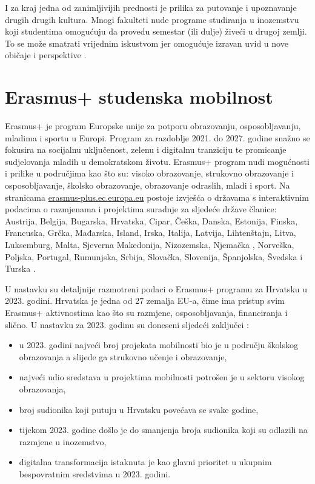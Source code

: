 \documentclass[]{foi}
\begin{document}
I za kraj jedna od zanimljivijih prednosti je prilika za putovanje i upoznavanje drugih drugih kultura. Mnogi fakulteti nude programe studiranja u inozemstvu koji studentima omogućuju da provedu 
semestar (ili dulje) živeći u drugoj zemlji. To se može smatrati vrijednim iskustvom jer omogućuje izravan uvid u nove običaje i perspektive \cite{bisio2025college}.


\section{Erasmus+ studenska mobilnost}

Erasmus+ je program Europske unije za potporu obrazovanju, osposobljavanju, mladima i sportu u Europi. Program za razdoblje 2021. do 2027. godine snažno se fokusira na socijalnu uključenost,
zelenu i digitalnu tranziciju te promicanje sudjelovanja mladih u demokratskom životu. Erasmus+ program nudi mogućnosti i prilike u područjima kao što su: visoko obrazovanje, strukovno obrazovanje i osposobljavanje,
školsko obrazovanje, obrazovanje odraslih, mladi i sport. 
Na stranicama \underline{erasmus-plus.ec.europa.eu} postoje izvješća o državama s interaktivnim podacima o razmjenama i projektima suradnje za sljedeće države članice:
Austrija, Belgija, Bugarska, Hrvatska, Cipar, Češka, Danska, Estonija, Finska, Francuska, Grčka, Mađarska, Island, Irska, Italija, Latvija, Lihtenštajn, Litva, 
Luksemburg, Malta, Sjeverna Makedonija, Nizozemska, Njemačka , Norveška, Poljska, Portugal, Rumunjska, Srbija, Slovačka, Slovenija, Španjolska, Švedska i Turska \cite{erasmus2025}.

U nastavku su detaljnije razmotreni podaci o Erasmus+ programu za Hrvatsku u 2023. godini. Hrvatska je jedna od 27 zemalja EU-a, čime ima pristup svim Erasmus+ 
aktivnostima kao što su razmjene, osposobljavanja, financiranja i slično. U nastavku za 2023. godinu su doneseni sljedeći zaključci \cite{erasmus2023croatia}:
\begin{itemize}
    \item u 2023. godini najveći broj projekata mobilnosti bio je u području školskog obrazovanja a slijede ga strukovno učenje i obrazovanje,
    \item najveći udio sredstava u projektima mobilnosti potrošen je u sektoru visokog obrazovanja,
    \item broj sudionika koji putuju u Hrvatsku povećava se svake godine,
    \item tijekom 2023. godine došlo je do smanjenja broja sudionika koji su odlazili na razmjene u inozemstvo,
    \item digitalna transformacija istaknuta je kao glavni prioritet u ukupnim bespovratnim sredstvima u 2023. godini. 
\end{itemize}
\end{document}
